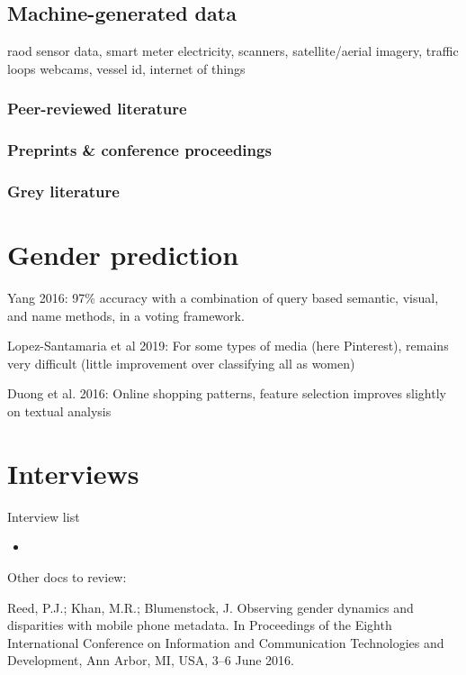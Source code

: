 \documentclass{article}
\begin{document}
\subsection{Machine-generated data}

raod sensor data, smart meter electricity, scanners, satellite/aerial imagery, traffic loops webcams, vessel id, internet of things

\subsubsection{Peer-reviewed literature}
\subsubsection{Preprints \& conference proceedings}

\subsubsection{Grey literature}



\section{Gender prediction}

Yang 2016: 97\% accuracy with a combination of query based semantic, visual, and name methods, in a voting framework.

Lopez-Santamaria et al 2019: For some types of media (here Pinterest), remains very difficult (little improvement over classifying all as women)

Duong et al. 2016: Online shopping patterns, feature selection improves slightly on textual analysis

\section{Interviews}


Interview list

\begin{itemize}
    \item
\end{itemize}

Other docs to review:

Reed, P.J.; Khan, M.R.; Blumenstock, J. Observing gender dynamics and disparities with mobile phone metadata. In Proceedings of the Eighth International Conference on Information and Communication Technologies and Development, Ann Arbor, MI, USA, 3–6 June 2016.
\end{document}
